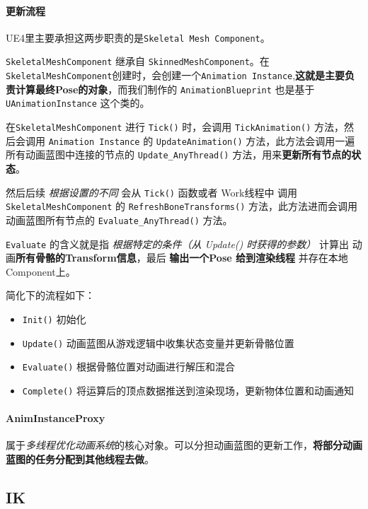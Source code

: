 \documentclass[UTF8,a4paper,12pt]{ctexbook}
\begin{document}
			\paragraph{更新流程}
				UE4里主要承担这两步职责的是\verb|Skeletal Mesh Component|。
				
				\verb|SkeletalMeshComponent| 继承自 \verb|SkinnedMeshComponent|。在\verb|SkeletalMeshComponent|创建时，会创建一个\verb|Animation Instance|,\textbf{这就是主要负责计算最终Pose的对象}，而我们制作的 \verb|AnimationBlueprint| 也是基于 \verb|UAnimationInstance| 这个类的。
				
				在\verb|SkeletalMeshComponent| 进行 \verb|Tick()| 时，会调用 \verb|TickAnimation()| 方法，然后会调用 \verb|Animation Instance| 的 \verb|UpdateAnimation()| 方法，此方法会调用一遍所有动画蓝图中连接的节点的 \verb|Update_AnyThread()| 方法，用来\textbf{更新所有节点的状态}。
				
				然后后续 \textit{根据设置的不同} 会从 \verb|Tick()| 函数或者 Work线程中 调用 \verb|SkeletalMeshComponent| 的 \verb|RefreshBoneTransforms()| 方法，此方法进而会调用动画蓝图所有节点的 \verb|Evaluate_AnyThread()| 方法。
				
				\verb|Evaluate| 的含义就是指 \textit{根据特定的条件（从 Update() 时获得的参数）} 计算出 动画\textbf{所有骨骼的Transform信息}，最后 \textbf{输出一个Pose 给到渲染线程} 并存在本地Component上。
				
				简化下的流程如下：
				\begin{itemize}
					\item \verb|Init()| 初始化
					\item \verb|Update()| 动画蓝图从游戏逻辑中收集状态变量并更新骨骼位置
					\item \verb|Evaluate()| 根据骨骼位置对动画进行解压和混合
					\item \verb|Complete()| 将运算后的顶点数据推送到渲染现场，更新物体位置和动画通知
				\end{itemize}
				
				
			\paragraph{AnimInstanceProxy}
				属于\textit{多线程优化动画系统}的核心对象。可以分担动画蓝图的更新工作，\textbf{将部分动画蓝图的任务分配到其他线程去做}。
			
			
			
		\subsection{IK}
		
\end{document}
